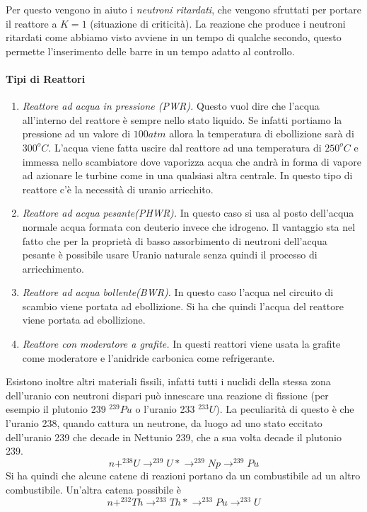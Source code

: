 Per questo vengono in aiuto i \emph{neutroni ritardati}, che vengono sfruttati per portare il reattore a $K=1$ (situazione di criticità).
La reazione che produce i neutroni ritardati come abbiamo visto avviene in un tempo di qualche secondo, questo permette l'inserimento delle barre in un tempo adatto al controllo.

\paragraph{Tipi di Reattori}
\begin{enumerate}
\item \emph{Reattore ad acqua in pressione (PWR).} 
Questo vuol dire che l'acqua all'interno del reattore è sempre nello stato liquido. 
Se infatti portiamo la pressione ad un valore di $100 atm$ allora la temperatura di ebollizione sarà di $300^oC$.
L'acqua viene fatta uscire dal reattore ad una temperatura di $250^oC$ e immessa nello scambiatore dove vaporizza acqua che andrà in forma di vapore ad azionare le turbine come in una qualsiasi altra centrale.
In questo tipo di reattore c'è la necessità di uranio arricchito.

\item \emph{Reattore ad acqua pesante(PHWR).}
In questo caso si usa al posto dell'acqua normale acqua formata con deuterio invece che idrogeno.
Il vantaggio sta nel fatto che per la proprietà di basso assorbimento di neutroni dell'acqua pesante è possibile usare Uranio naturale senza quindi il processo di arricchimento.

\item \emph{Reattore ad acqua bollente(BWR).}
In questo caso l'acqua nel circuito di scambio viene portata ad ebollizione. Si ha che quindi l'acqua del reattore viene portata ad ebollizione.

\item \emph{Reattore con moderatore a grafite.}
In questi reattori viene usata la grafite come moderatore e l'anidride carbonica come refrigerante.
\end{enumerate}

Esistono inoltre altri materiali fissili, infatti tutti i nuclidi della stessa zona dell'uranio con neutroni dispari può innescare una reazione di fissione (per esempio il plutonio 239 $^{239}Pu$ o l'uranio 233 $^{233}U$).
La peculiarità di questo è che l'uranio 238, quando cattura un neutrone, da luogo ad uno stato eccitato dell'uranio 239 che decade in Nettunio 239, che a sua volta decade il plutonio 239.
\begin{equation}
n+ ^{238}U\to ^{239}U*\to ^{239}Np\to ^{239}Pu
\end{equation}
Si ha quindi che alcune catene di reazioni portano da un combustibile ad un altro combustibile.
Un'altra catena possibile è 
\begin{equation}
n+^{232}Th\to ^{233}Th*\to ^{233}Pu\to ^{233}U
\end{equation}





